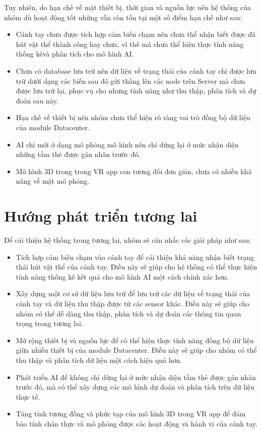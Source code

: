 Tuy nhiên, do hạn chế về mặt thiết bị, thời gian và nguồn lực nên hệ thống của nhóm dù hoạt động tốt những vẫn còn tồn tại một số điểm hạn chế như sau:
\begin{itemize}
    \item Cánh tay chưa được tích hợp cảm biến chạm nên chưa thể nhận biết được đã hút vật thể thành công hay chưa, vì thế mà chưa thể hiện thực tính năng thống kêvà phân tích cho mô hình AI.
    \item Chưa có database lưu trữ nên dữ liệu về trạng thái của cánh tay chỉ được lưu trữ dưới dạng các biến sau đó gửi thẳng lên các node trên Server mà chưa được lưu trữ lại, phục vụ cho nhưng tính năng như thu thập, phân tích và dự đoán sau này.
    \item Hạn chế về thiết bị nên nhóm chưa thể hiện rõ ràng vai trò đồng bộ dữ liệu của module Datacenter.
    \item AI chỉ mới ở dạng mô phỏng mô hình nên chỉ dừng lại ở mức nhận diện những tắm thẻ được gán nhãn trước đó.
    \item Mô hình 3D trong trong VR app con tương đối đơn giản, chưa có nhiều khả năng về mặt mô phỏng.
\end{itemize}
\section{Hướng phát triển tương lai}
Để cải thiện hệ thống trong tương lai, nhóm sẽ cân nhắc các giải pháp như sau:
\begin{itemize}
    \item Tích hợp cảm biến chạm vào cánh tay để cải thiện khả năng nhận biết trạng thái hút vật thể của cánh tay. Điều này sẽ giúp cho hệ thống có thể thực hiện tính năng thống kê kết quả cho mô hình AI một cách chính xác hơn.
    \item  Xây dựng một cơ sở dữ liệu lưu trữ để lưu trữ các dữ liệu về trạng thái của cánh tay và dữ liệu thu thập được từ các sensor khác. Điều này sẽ giúp cho nhóm có thể dễ dàng thu thập, phân tích và dự đoán các thông tin quan trọng trong tương lai.
    \item Mở rộng thiết bị và nguồn lực để có thể hiện thực tính năng đồng bộ dữ liệu giữa nhiều thiết bị của module Datacenter. Điều này sẽ giúp cho nhóm có thể thu thập và phân tích dữ liệu một cách hiệu quả hơn.
    \item Phát triển AI để không chỉ dừng lại ở mức nhận diện tắm thẻ được gán nhãn trước đó, mà có thể xây dựng các mô hình dự đoán và phân tích trên dữ liệu thực tế.
    \item Tăng tính tương đồng và phức tạp của mô hình 3D trong VR app để đảm bảo tính chân thực và mô phỏng được các hoạt động và hành vi của cánh tay.
\end{itemize}